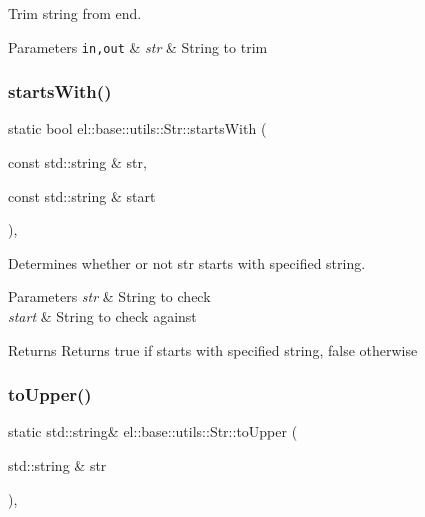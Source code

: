 Trim string from end. 


\begin{DoxyParams}[1]{Parameters}
\mbox{\tt in,out}  & {\em str} & String to trim \\
\hline
\end{DoxyParams}
\mbox{\label{classel_1_1base_1_1utils_1_1_str_acf80221cec72da701ef50995a61ab91f}} 
\subsubsection{\texorpdfstring{starts\+With()}{startsWith()}}
{\footnotesize\ttfamily static bool el\+::base\+::utils\+::\+Str\+::starts\+With (\begin{DoxyParamCaption}\item[{const std\+::string \&}]{str,  }\item[{const std\+::string \&}]{start }\end{DoxyParamCaption})\hspace{0.3cm}{\ttfamily [inline]}, {\ttfamily [static]}}



Determines whether or not str starts with specified string. 


\begin{DoxyParams}{Parameters}
{\em str} & String to check \\
\hline
{\em start} & String to check against \\
\hline
\end{DoxyParams}
\begin{DoxyReturn}{Returns}
Returns true if starts with specified string, false otherwise 
\end{DoxyReturn}
\mbox{\label{classel_1_1base_1_1utils_1_1_str_a6a05315fb967508dc1faf0584421a95d}} 
\subsubsection{\texorpdfstring{to\+Upper()}{toUpper()}}
{\footnotesize\ttfamily static std\+::string\& el\+::base\+::utils\+::\+Str\+::to\+Upper (\begin{DoxyParamCaption}\item[{std\+::string \&}]{str }\end{DoxyParamCaption})\hspace{0.3cm}{\ttfamily [inline]}, {\ttfamily [static]}}



